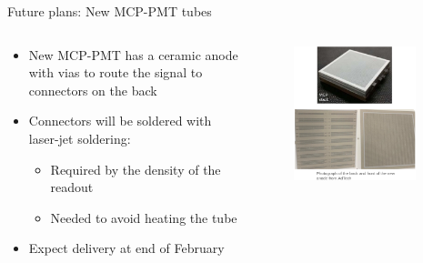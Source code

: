 \documentclass[xcolor={dvipsnames}]{beamer}
\begin{document}
\begin{frame}{Future plans: New MCP-PMT tubes}
  \begin{columns}
    \begin{column}{0.5\textwidth}
      \begin{itemize}
        \setlength\itemsep{1.0em}
        \item{New MCP-PMT has a ceramic anode with vias to route the signal to connectors on the back}
        \item{Connectors will be soldered with laser-jet soldering:}
        \begin{itemize}
          \item{Required by the density of the readout}
          \item{Needed to avoid heating the tube}
        \end{itemize}
        \item{Expect delivery at end of February}
      \end{itemize}
    \end{column}
    \begin{column}{0.5\textwidth}
      \begin{figure}
        \centering
        \includegraphics[width = 0.9\textwidth]{Figs/NewMCPFrontBack.png}
      \end{figure}
    \end{column}
  \end{columns}
\end{frame}
\end{document}
